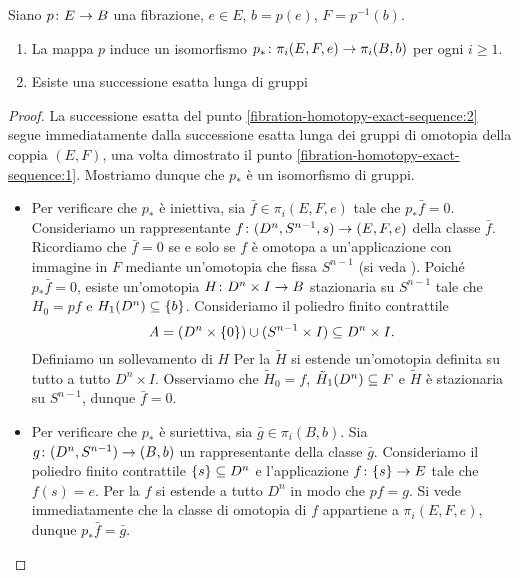 \begin{proposition}
Siano \(\map{p}{E}{B}\) una fibrazione, \(e\in E\), \(b=p(e)\), \(F=p^{-1}(b)\).
\begin{enumerate}
\item\label{fibration-homotopy-exact-sequence:1} La mappa \(p\) induce un isomorfismo \(\map{p_*}{\pi_i(E,F,e)}{\pi_i(B,b)}\) per ogni \(i\ge 1\).
\item\label{fibration-homotopy-exact-sequence:2} Esiste una successione esatta lunga di gruppi
\end{enumerate}
\end{proposition}
\begin{proof}
La successione esatta del punto \ref{fibration-homotopy-exact-sequence:2} segue immediatamente dalla successione esatta lunga dei gruppi di omotopia della coppia \((E,F)\), una volta dimostrato il punto \ref{fibration-homotopy-exact-sequence:1}. Mostriamo dunque che \(p_*\) è un isomorfismo di gruppi.
\begin{itemize}
\item Per verificare che \(p_*\) è iniettiva, sia \(\bar{f}\in\pi_i(E,F,e)\) tale che \(p_*\bar{f}=0\). Consideriamo un rappresentante \(\map{f}{(D^n,S^{n-1},s)}{(E,F,e)}\) della classe \(\bar{f}\). Ricordiamo che \(\bar{f}=0\) se e solo se \(f\) è omotopa a un'applicazione con immagine in \(F\) mediante un'omotopia che fissa \(S^{n-1}\) (si veda ). Poiché \(p_*\bar{f}=0\), esiste un'omotopia \(\map{H}{D^n\times I}{B}\) stazionaria su \(S^{n-1}\) tale che \(H_0=pf\) e \(H_1(D^n)\subseteq\{b\}\). Consideriamo il poliedro finito contrattile 
\[
A=(D^n\times\{0\})\cup(S^{n-1}\times I)\subseteq D^n\times I.
\]
Definiamo un sollevamento di \(H\)
Per la  \(\tilde{H}\) si estende un'omotopia definita su tutto a tutto \(D^n\times I\). Osserviamo che \(\tilde{H}_0=f\), \(\tilde{H}_1(D^n)\subseteq F\) e \(\tilde{H}\) è stazionaria su \(S^{n-1}\), dunque \(\bar{f}=0\).
\item Per verificare che \(p_*\) è suriettiva, sia \(\bar{g}\in\pi_i(B,b)\). Sia \(\map{g}{(D^n,S^{n-1})}{(B,b)}\) un rappresentante della classe \(\bar{g}\). Consideriamo il poliedro finito contrattile \(\{s\}\subseteq D^n\) e l'applicazione \(\map{f}{\{s\}}{E}\) tale che \(f(s)=e\). Per la  \(f\) si estende a tutto \(D^n\) in modo che \(pf=g\). Si vede immediatamente che la classe di omotopia di \(f\) appartiene a \(\pi_i(E,F,e)\), dunque \(p_*\bar{f}=\bar{g}\).\qedhere
\end{itemize}
\end{proof}

